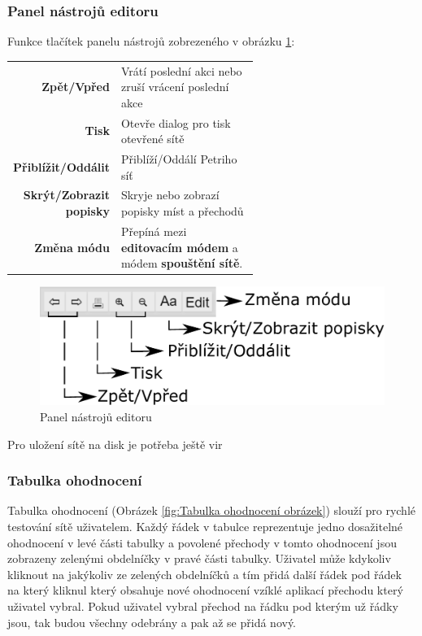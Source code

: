 \documentclass[
  biblatex,
  glossaries,
  index
]{kidiplom}
\begin{document}

\subsubsection{Panel nástrojů editoru}\label{panel nástrojů}

Funkce tlačítek panelu nástrojů zobrezeného v obrázku \ref{fig:Panel nástrojů editoru}:
\begin{center}
  \begin{tabular}{r p{0.6\linewidth}}
    \textbf{Zpět/Vpřed}          & Vrátí poslední akci nebo zruší vrácení poslední akce \\
    \textbf{Tisk}                & Otevře dialog pro tisk otevřené sítě \\
    \textbf{Přiblížit/Oddálit}   & Přiblíží/Oddálí Petriho síť \\
    \textbf{Skrýt/Zobrazit popisky}  & Skryje nebo zobrazí popisky míst a přechodů \\
    \textbf{Změna módu}  & Přepíná mezi \textbf{editovacím módem} a módem \textbf{spouštění sítě}. \\
  \end{tabular}
\end{center}


\begin{figure}[h]
  \centering
  \includegraphics[width=\linewidth]{bar}
  \caption{Panel nástrojů editoru}\label{fig:Panel nástrojů editoru}
\end{figure}


Pro uložení sítě na disk je potřeba ještě vir


\subsubsection{Tabulka ohodnocení}\label{tabulka ohodnocení}

Tabulka ohodnocení (Obrázek \ref{fig:Tabulka ohodnocení obrázek}) slouží pro rychlé testování sítě uživatelem.
Každý řádek v tabulce reprezentuje jedno dosažitelné ohodnocení 
v levé části tabulky a povolené přechody v tomto ohodnocení jsou 
zobrazeny zelenými obdelníčky v pravé části tabulky.
Uživatel může kdykoliv kliknout na jakýkoliv ze zelených obdelníčků 
a tím přidá další řádek pod řádek na který kliknul který obsahuje 
nové ohodnocení vzíklé aplikací přechodu který uživatel vybral.
Pokud uživatel vybral přechod na řádku pod kterým už řádky jsou, 
tak budou všechny odebrány a pak až se přidá nový.
\end{document}
